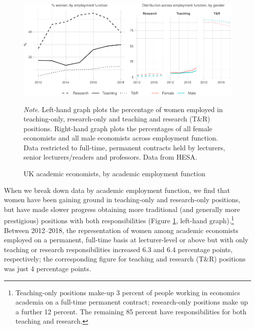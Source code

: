 \documentclass[a4paper, 1]{article}
\begin{document}
\begin{figure}
\centering
\includegraphics[width=\linewidth]{0-images/emp-function-1.pdf}

\caption{UK academic economists, by academic employment function}
\label{fig:emp-function}
\justify\footnotesize\textit{Note}.  Left-hand graph plots the percentage of women employed in teaching-only, research-only and teaching and research (T\&R) positions. Right-hand graph plots the percentages of all female economists and all male economists across employment function. Data restricted to full-time, permanent contracts held by lecturers, senior lecturers/readers and professors. Data from HESA.
\end{figure}



When we break down data by academic employment function, we find that women have been gaining ground in teaching-only and research-only positions, but have made slower progress obtaining more traditional (and generally more prestigious) positions with both responsibilities (Figure \ref{fig:emp-function}, left-hand graph).\footnote{Teaching-only positions make-up 3 percent of people working in economics academia on a full-time permanent contract; research-only positions make up a further 12 percent. The remaining 85 percent have responsibilities for both teaching and research.} Between 2012--2018, the representation of women among academic economists employed on a permanent, full-time basis at lecturer-level or above but with only teaching or research responsibilities increased 6.3 and 6.4 percentage points, respectively; the corresponding figure for teaching and research (T\&R) positions was just 4 percentage points.
\end{document}
